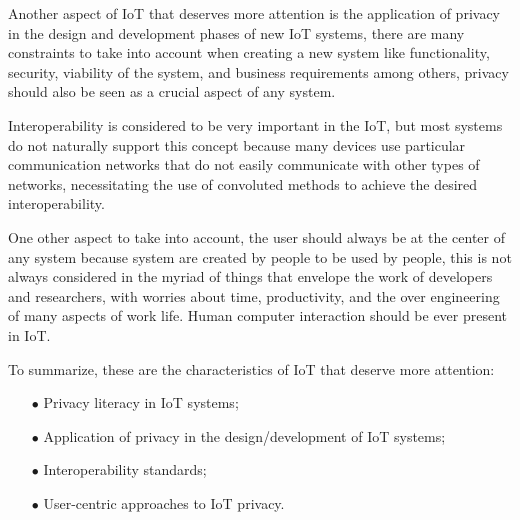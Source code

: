 Another aspect of IoT that deserves more attention
is the application of privacy in the design and development phases of new
IoT systems, there are many constraints to take into account when creating a
new system like functionality, security, viability of the system, and business
requirements among others, privacy should also be seen as a crucial aspect
of any system.

Interoperability is considered to be very important in the IoT,
but most systems do not naturally support this concept because many devices use particular
communication networks that do not easily communicate with other types of networks,
necessitating the use of convoluted methods to achieve the desired interoperability.

One other aspect to take into account, the user should always be at the center
of any system because system are created by people to be used by people, this is not
always considered in the myriad of things that envelope the work of developers
and researchers, with worries about time, productivity, and the over
engineering of many aspects of work life. Human computer interaction should
be ever present in IoT.

To summarize, these are the characteristics of IoT that deserve more attention:

\begin{itemize}
    \item[$\bullet$]
    Privacy literacy in IoT systems;
    \item[$\bullet$]
    Application of privacy in the design/development of IoT systems;
    \item[$\bullet$]
    Interoperability standards;
    \item[$\bullet$]
    User-centric approaches to IoT privacy.
\end{itemize}
